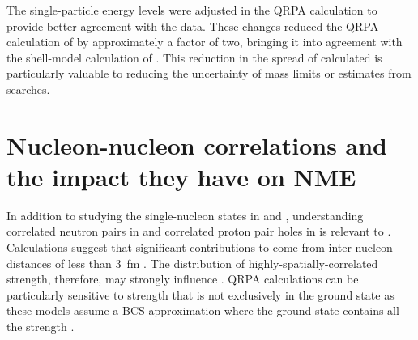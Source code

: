 The single-particle energy levels were adjusted in the QRPA calculation \citep{SuhonenEnergyAdjust} to provide better agreement with the data.  These changes reduced the QRPA calculation of \NME by approximately a factor of two, bringing it into agreement with the shell-model calculation of \NME.  This reduction in the spread of calculated \NME is particularly valuable to reducing the uncertainty of mass limits or estimates from \zvbb searches. 

\section{Nucleon-nucleon correlations and the impact they have on NME}
\label{sec:correlations}

In addition to studying the single-nucleon states in \GeTargets and \SeProducts, understanding correlated neutron pairs in  and correlated proton pair holes in  is relevant to \NME.  Calculations suggest that significant contributions to \NME come from inter-nucleon distances of less than 3~fm \citep{anatomy}.  The distribution of highly-spatially-correlated \zp strength, therefore, may strongly influence \NME.  QRPA calculations can be particularly sensitive to \zp strength that is not exclusively in the ground state as these models assume a BCS approximation where the ground state contains all the \zp strength \citep{BenderSCMF}. 
